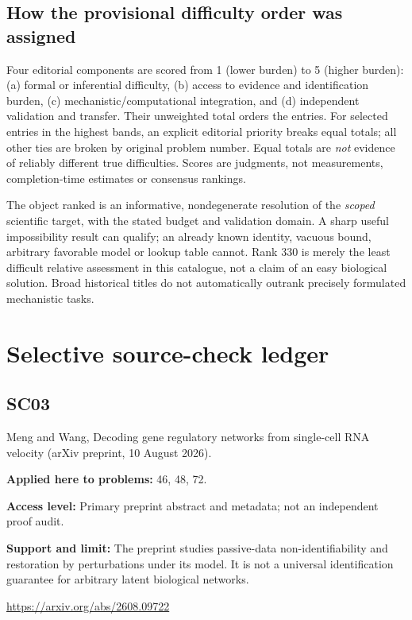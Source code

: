 \documentclass[11pt]{article}
\begin{document}
\subsection*{How the provisional difficulty order was assigned}
Four editorial components are scored from 1 (lower burden) to 5 (higher burden): (a) formal or inferential difficulty, (b) access to evidence and identification burden, (c) mechanistic/computational integration, and (d) independent validation and transfer. Their unweighted total orders the entries. For selected entries in the highest bands, an explicit editorial priority breaks equal totals; all other ties are broken by original problem number. Equal totals are \emph{not} evidence of reliably different true difficulties. Scores are judgments, not measurements, completion-time estimates or consensus rankings.

The object ranked is an informative, nondegenerate resolution of the \emph{scoped} scientific target, with the stated budget and validation domain. A sharp useful impossibility result can qualify; an already known identity, vacuous bound, arbitrary favorable model or lookup table cannot. Rank 330 is merely the least difficult relative assessment in this catalogue, not a claim of an easy biological solution. Broad historical titles do not automatically outrank precisely formulated mechanistic tasks.


\section*{Selective source-check ledger}
\subsection*{SC03}\label{check:SC03}

Meng and Wang, Decoding gene regulatory networks from single-cell RNA velocity (arXiv preprint, 10 August 2026).

\textbf{Applied here to problems:} 46, 48, 72.

\textbf{Access level:} Primary preprint abstract and metadata; not an independent proof audit.

\textbf{Support and limit:} The preprint studies passive-data non-identifiability and restoration by perturbations under its model. It is not a universal identification guarantee for arbitrary latent biological networks.

\url{https://arxiv.org/abs/2608.09722}
\end{document}

